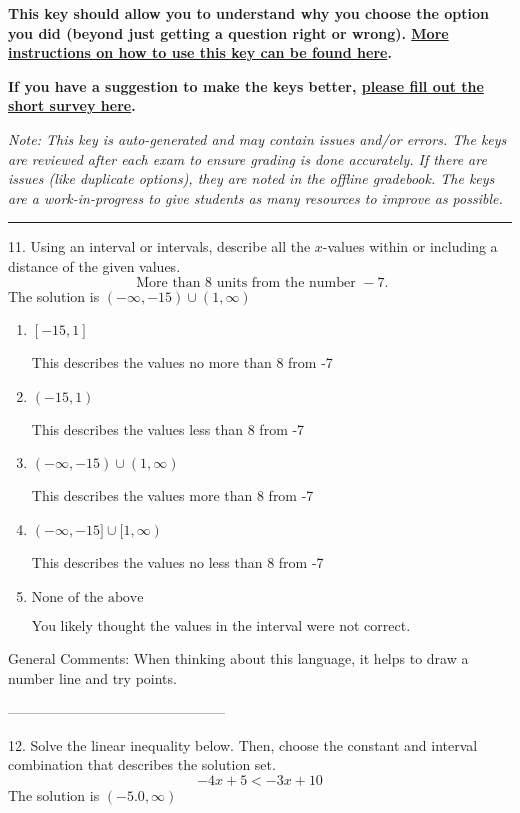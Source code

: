 \documentclass{extbook}[14pt]
\begin{document}
\textbf{This key should allow you to understand why you choose the option you did (beyond just getting a question right or wrong). \href{https://xronos.clas.ufl.edu/mac1105spring2020/courseDescriptionAndMisc/Exams/LearningFromResults}{More instructions on how to use this key can be found here}.}

\textbf{If you have a suggestion to make the keys better, \href{https://forms.gle/CZkbZmPbC9XALEE88}{please fill out the short survey here}.}

\textit{Note: This key is auto-generated and may contain issues and/or errors. The keys are reviewed after each exam to ensure grading is done accurately. If there are issues (like duplicate options), they are noted in the offline gradebook. The keys are a work-in-progress to give students as many resources to improve as possible.}

\rule{\textwidth}{0.4pt}

11. Using an interval or intervals, describe all the $x$-values within or including a distance of the given values.
\[ \text{ More than } 8 \text{ units from the number } -7. \] 
The solution is $ (-\infty, -15) \cup (1, \infty) $ 

\begin{enumerate}[label=\Alph*.] 
\item $ [-15, 1] $ 

 This describes the values no more than 8 from -7 
\item $ (-15, 1) $ 

 This describes the values less than 8 from -7 
\item $ (-\infty, -15) \cup (1, \infty) $ 

 This describes the values more than 8 from -7 
\item $ (-\infty, -15] \cup [1, \infty) $ 

 This describes the values no less than 8 from -7 
\item $ \text{None of the above} $ 

 You likely thought the values in the interval were not correct. 
\end{enumerate} 
 
General Comments: When thinking about this language, it helps to draw a number line and try points.

-----------------------------------------------

12. Solve the linear inequality below. Then, choose the constant and interval combination that describes the solution set.
\[ -4x + 5 < -3x + 10 \] 
The solution is $ (-5.0, \infty) $ 
\end{document}
